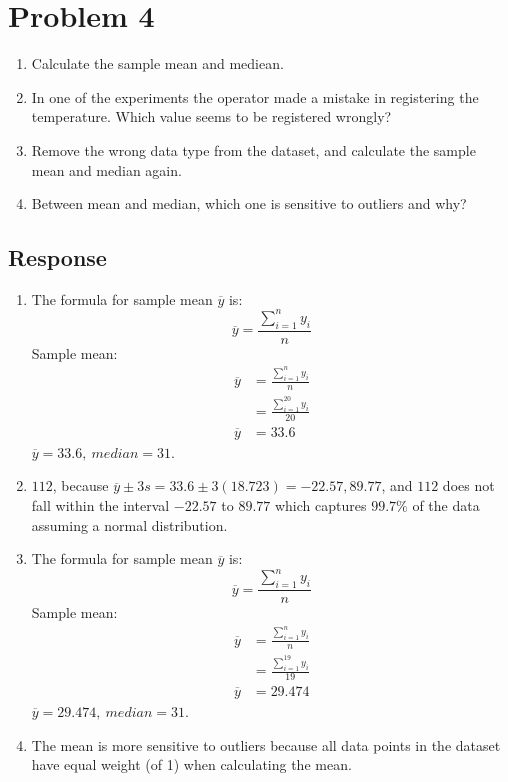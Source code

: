 \documentclass[13pt]{article}
\begin{document}
\newpage
\section*{Problem 4}
\begin{enumerate}[label=\alph*)]
\item Calculate the sample mean and mediean.
\item In one of the experiments the operator made a mistake in registering the temperature. Which value seems to
  be registered wrongly?
\item Remove the wrong data type from the dataset, and calculate the sample mean and median again.
\item Between mean and median, which one is sensitive to outliers and why?
\end{enumerate}

\subsection*{Response}
\begin{enumerate}[label=\alph*)]
\item The formula for sample mean $\overline{y}$ is:
  \[\overline{y} = \frac{\sum_{i = 1}^{n} y_i}{n}\]
  Sample mean:
  \begin{align*}
    \overline{y} &= \frac{\sum_{i = 1}^{n} y_i}{n} \\
                 &= \frac{\sum_{i = 1}^{20}y_i}{20} \\
    \overline{y} &= 33.6
  \end{align*}
  $\overline{y} = 33.6, \ median = 31$.
  
\item $112$, because $\overline{y} \pm 3s = 33.6 \pm 3(18.723) = -22.57, 89.77$, and $112$ does not fall within the
  interval $-22.57$ to $ 89.77$ which captures $99.7\%$ of the data assuming a normal distribution.

\item The formula for sample mean $\overline{y}$ is:
  \[\overline{y} = \frac{\sum_{i = 1}^{n} y_i}{n}\]
  Sample mean:
  \begin{align*}
    \overline{y} &= \frac{\sum_{i = 1}^{n} y_i}{n} \\
                 &= \frac{\sum_{i = 1}^{19}y_i}{19} \\
    \overline{y} &= 29.474
  \end{align*}
  $\overline{y} = 29.474, \ median = 31$.
  
\item The mean is more sensitive to outliers because all data points in the dataset have equal weight (of 1) when
  calculating the mean.
\end{enumerate}
\end{document}
